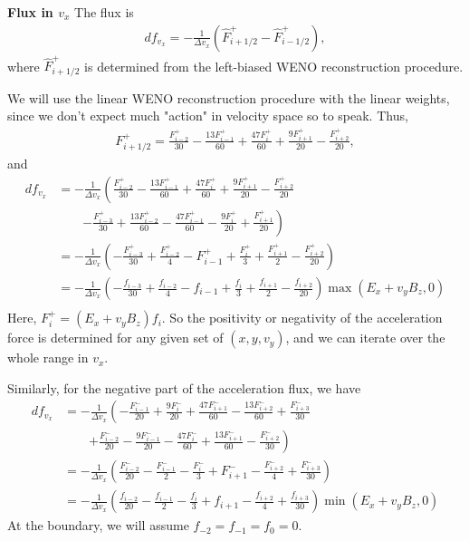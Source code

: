 \documentclass{article}
\begin{document}
\textbf{Flux in $v_x$}
The flux is
\begin{align*}
    df_{v_x} = -\frac{1}{\Delta v_x} \left( \hat{F}^+_{i+1/2} - \hat{F}^+_{i-1/2} \right),
\end{align*}
where $\hat{F}^+_{i+1/2}$ is determined from the left-biased WENO reconstruction procedure.

We will use the linear WENO reconstruction procedure with the linear weights, since we don't expect
much "action" in velocity space so to speak.
Thus,
\begin{align*}
    F^+_{i+1/2} = \frac{F^+_{i-2}}{30} - \frac{13 F^+_{i-1}}{60} + \frac{47 F^+_i}{60} + \frac{9 F^+_{i+1}}{20} - \frac{F^+_{i+2}}{20},
\end{align*}
and 
\begin{align*}
    df_{v_x} &= -\frac{1}{\Delta v_x} \left( \frac{F^+_{i-2}}{30} - \frac{13 F^+_{i-1}}{60} + \frac{47 F^+_i}{60} + \frac{9 F^+_{i+1}}{20} - \frac{F^+_{i+2}}{20} \right. \\
             &\qquad \left. - \frac{F^+_{i-3}}{30} + \frac{13 F^+_{i-2}}{60} - \frac{47 F^+_{i-1}}{60} - \frac{9 F^+_{i}}{20} + \frac{F^+_{i+1}}{20} \right) \\
             &= -\frac{1}{\Delta v_x} \left( -\frac{F^+_{i-3}}{30} + \frac{F^+_{i-2}}{4} - F^+_{i-1} + \frac{F^+_{i}}{3} + \frac{F^+_{i+1}}{2} - \frac{F^+_{i+2}}{20} \right) \\
             &= -\frac{1}{\Delta v_x} \left( -\frac{f_{i-3}}{30} + \frac{f_{i-2}}{4} - f_{i-1} + \frac{f_{i}}{3} + \frac{f_{i+1}}{2} - \frac{f_{i+2}}{20} \right) \max(E_x + v_y B_z, 0) \\
\end{align*}
Here, $F^+_i = (E_x + v_y B_z) f_i$.
So the positivity or negativity of the acceleration force is determined for any given set of $(x, y, v_y)$, and we can iterate over the whole
range in $v_x$.

Similarly, for the negative part of the acceleration flux, we have
\begin{align*}
    df_{v_x} &= -\frac{1}{\Delta v_x} \left( -\frac{F^-_{i-1}}{20} + \frac{9F^-_i}{20} + \frac{47 F^-_{i+1}}{60} - \frac{13F^-_{i+2}}{60} + \frac{F^-_{i+3}}{30} \right. \\
             &\qquad \left. + \frac{F^-_{i-2}}{20} - \frac{9F^-_{i-1}}{20} - \frac{47F^-_i}{60} + \frac{13F^-_{i+1}}{60} - \frac{F^-_{i+2}}{30} \right) \\
             &= -\frac{1}{\Delta v_x} \left( \frac{F^-_{i-2}}{20} - \frac{F^-_{i-1}}{2} - \frac{F^-_{i}}{3} + F^-_{i+1} - \frac{F^-_{i+2}}{4} + \frac{F^-_{i+3}}{30} \right) \\
             &= -\frac{1}{\Delta v_x} \left( \frac{f_{i-2}}{20} - \frac{f_{i-1}}{2} - \frac{f_{i}}{3} + f_{i+1} - \frac{f_{i+2}}{4} + \frac{f_{i+3}}{30} \right) \min(E_x + v_y B_z, 0)
\end{align*}
At the boundary, we will assume $f_{-2} = f_{-1} = f_{0} = 0$.
\end{document}

